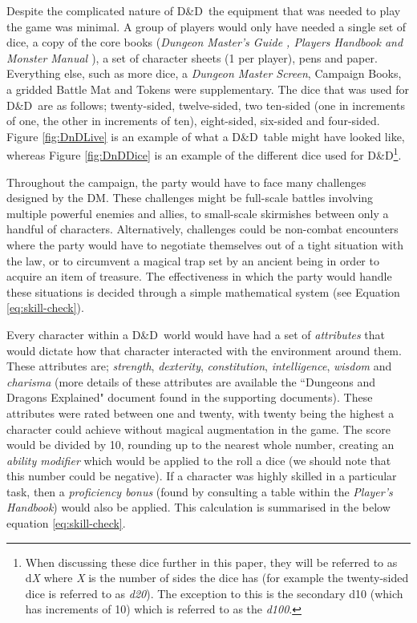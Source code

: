 \documentclass[final]{cmpreport}
\newcommand{\dnd}{D\&D}
\begin{document}
			Despite the complicated nature of \dnd \ the equipment that was needed to play the game was minimal. A group of players would only have needed a single set of dice, a copy of the core books (\emph{Dungeon Master's Guide \citep{DMGuide}, Players Handbook and Monster Manual \citep{MonsterManual}}), a set of character sheets (1 per player), pens and paper. Everything else, such as more dice, a \emph{Dungeon Master Screen}, Campaign Books, a gridded Battle Mat and Tokens were supplementary. The dice that was used for \dnd \ are as follows; twenty-sided, twelve-sided, two ten-sided (one in increments of one, the other in increments of ten), eight-sided, six-sided and four-sided. Figure \ref{fig:DnDLive} is an example of what a \dnd \ table might have looked like, whereas Figure \ref{fig:DnDDice} is an example of the different dice used for \dnd \footnote{When discussing these dice further in this paper, they will be referred to as d\emph{X} where \emph{X} is the number of sides the dice has (for example the twenty-sided dice is referred to as \emph{d20}). The exception to this is the secondary d10 (which has increments of 10) which is referred to as the \emph{d100}.}.
			
			Throughout the campaign, the party would have to face many challenges designed by the DM. These challenges might be full-scale battles involving multiple powerful enemies and allies, to small-scale skirmishes between only a handful of characters. Alternatively, challenges could be non-combat encounters where the party would have to negotiate themselves out of a tight situation with the law, or to circumvent a magical trap set by an ancient being in order to acquire an item of treasure. The effectiveness in which the party would handle these situations is decided through a simple mathematical system (see Equation \ref{eq:skill-check}). 
			
			Every character within a \dnd \ world would have had a set of \emph{attributes} that would dictate how that character interacted with the environment around them. These attributes are; \emph{strength}, \emph{dexterity}, \emph{constitution}, \emph{intelligence}, \emph{wisdom} and \emph{charisma} (more details of these attributes are available the ``Dungeons and Dragons Explained" document found in the supporting documents). These attributes were rated between one and twenty, with twenty being the highest a character could achieve without magical augmentation in the game. The score would be divided by 10, rounding up to the nearest whole number, creating an \emph{ability modifier} which would be applied to the roll a dice (we should note that this number could be negative). If a character was highly skilled in a particular task, then a \emph{proficiency bonus} (found by consulting a table within the \textit{Player's Handbook}) would also be applied. This calculation is summarised in the below equation \ref{eq:skill-check}. 
			
\end{document}
